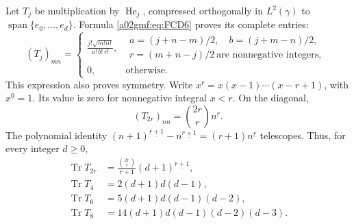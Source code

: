 Let \(T_j\) be multiplication by \(\operatorname{He}_j\), compressed
orthogonally in \(L^2(\gamma)\) to
\(\operatorname{span}\{e_0,\ldots,e_d\}\). Formula \eqref{a02gmf:eq:FCD6}
proves its complete entries:
\begin{equation}
 (T_j)_{mn}=
 \begin{cases}
 \displaystyle
 \frac{j!\sqrt{m!n!}}{a!\,b!\,r!},
 &
\begin{gathered}
 a=(j+n-m)/2,\quad b=(j+m-n)/2,\\ r=(m+n-j)/2
       \ \text{are nonnegative integers},
\end{gathered}\\[4pt]
 0,&\text{otherwise}.
 \end{cases}
 \tag{FCD7}\label{a02gmf:eq:FCD7}
\end{equation}
This expression also proves symmetry. Write
\(x^{\underline r}=x(x-1)\cdots(x-r+1)\), with
\(x^{\underline0}=1\). Its value is zero for nonnegative integral
\(x<r\). On the diagonal,
\[
 (T_{2r})_{nn}=\binom{2r}{r}n^{\underline r}.
\]
The polynomial identity
\((n+1)^{\underline{r+1}}-n^{\underline{r+1}}
 =(r+1)n^{\underline r}\)
telescopes. Thus, for every integer \(d\ge0\),
\begin{equation}
\begin{aligned}
 \operatorname{Tr}T_{2r}
    &=\frac{\binom{2r}{r}}{r+1}(d+1)^{\underline{r+1}},\\
 \operatorname{Tr}T_4&=2(d+1)d(d-1),\\
 \operatorname{Tr}T_6&=5(d+1)d(d-1)(d-2),\\
 \operatorname{Tr}T_8&=14(d+1)d(d-1)(d-2)(d-3).
\end{aligned}
 \tag{FCD8}\label{a02gmf:eq:FCD8}
\end{equation}

